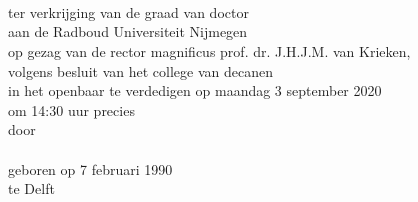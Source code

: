 \newpage

\thispagestyle{empty}
\vspace*{4em}
%
\begin{center}
\huge{}\\
\huge{}\\
\normalsize

{\Large\scshape{}}\\[2.5em]


ter verkrijging van de graad van doctor\\
aan de Radboud Universiteit Nijmegen\\
op gezag van de rector magnificus prof. dr. J.H.J.M. van Krieken,\\
volgens besluit van het college van decanen\\
in het openbaar te verdedigen op maandag 3 september 2020\\
om 14:30 uur precies\\[1.5em]

door\\[1.5em]

{\Large\scshape{}}\\[1.5em]

geboren op 7 februari 1990\\
te Delft
\end{center}
\newpage
\thispagestyle{empty}

\noindent


